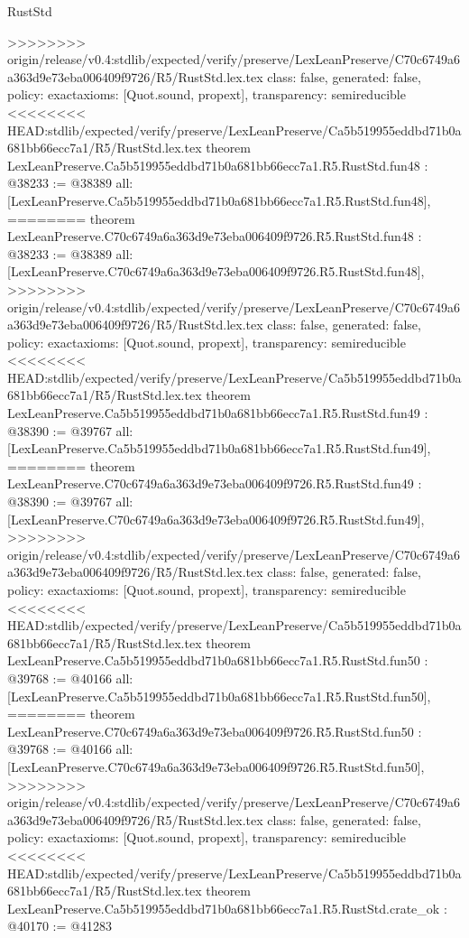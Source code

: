 \begin{lexlean}{RustStd}
\begin{coremodule}
{\begin{coremodule}
{{{{{{{{{{{{{{{{{{{{{{{{{{{{{{{{{{{{{{{{{{{{{{{{{{{>>>>>>>> origin/release/v0.4:stdlib/expected/verify/preserve/LexLeanPreserve/C70c6749a6a363d9e73eba006409f9726/R5/RustStd.lex.tex
  class: false,
  generated: false,
  policy: exact{axioms: [Quot.sound, propext]},
  transparency: semireducible
}
<<<<<<<< HEAD:stdlib/expected/verify/preserve/LexLeanPreserve/Ca5b519955eddbd71b0a681bb66ecc7a1/R5/RustStd.lex.tex
theorem LexLeanPreserve.Ca5b519955eddbd71b0a681bb66ecc7a1.R5.RustStd.fun48 : @38233 := @38389 {
  all: [LexLeanPreserve.Ca5b519955eddbd71b0a681bb66ecc7a1.R5.RustStd.fun48],
========
theorem LexLeanPreserve.C70c6749a6a363d9e73eba006409f9726.R5.RustStd.fun48 : @38233 := @38389 {
  all: [LexLeanPreserve.C70c6749a6a363d9e73eba006409f9726.R5.RustStd.fun48],
>>>>>>>> origin/release/v0.4:stdlib/expected/verify/preserve/LexLeanPreserve/C70c6749a6a363d9e73eba006409f9726/R5/RustStd.lex.tex
  class: false,
  generated: false,
  policy: exact{axioms: [Quot.sound, propext]},
  transparency: semireducible
}
<<<<<<<< HEAD:stdlib/expected/verify/preserve/LexLeanPreserve/Ca5b519955eddbd71b0a681bb66ecc7a1/R5/RustStd.lex.tex
theorem LexLeanPreserve.Ca5b519955eddbd71b0a681bb66ecc7a1.R5.RustStd.fun49 : @38390 := @39767 {
  all: [LexLeanPreserve.Ca5b519955eddbd71b0a681bb66ecc7a1.R5.RustStd.fun49],
========
theorem LexLeanPreserve.C70c6749a6a363d9e73eba006409f9726.R5.RustStd.fun49 : @38390 := @39767 {
  all: [LexLeanPreserve.C70c6749a6a363d9e73eba006409f9726.R5.RustStd.fun49],
>>>>>>>> origin/release/v0.4:stdlib/expected/verify/preserve/LexLeanPreserve/C70c6749a6a363d9e73eba006409f9726/R5/RustStd.lex.tex
  class: false,
  generated: false,
  policy: exact{axioms: [Quot.sound, propext]},
  transparency: semireducible
}
<<<<<<<< HEAD:stdlib/expected/verify/preserve/LexLeanPreserve/Ca5b519955eddbd71b0a681bb66ecc7a1/R5/RustStd.lex.tex
theorem LexLeanPreserve.Ca5b519955eddbd71b0a681bb66ecc7a1.R5.RustStd.fun50 : @39768 := @40166 {
  all: [LexLeanPreserve.Ca5b519955eddbd71b0a681bb66ecc7a1.R5.RustStd.fun50],
========
theorem LexLeanPreserve.C70c6749a6a363d9e73eba006409f9726.R5.RustStd.fun50 : @39768 := @40166 {
  all: [LexLeanPreserve.C70c6749a6a363d9e73eba006409f9726.R5.RustStd.fun50],
>>>>>>>> origin/release/v0.4:stdlib/expected/verify/preserve/LexLeanPreserve/C70c6749a6a363d9e73eba006409f9726/R5/RustStd.lex.tex
  class: false,
  generated: false,
  policy: exact{axioms: [Quot.sound, propext]},
  transparency: semireducible
}
<<<<<<<< HEAD:stdlib/expected/verify/preserve/LexLeanPreserve/Ca5b519955eddbd71b0a681bb66ecc7a1/R5/RustStd.lex.tex
theorem LexLeanPreserve.Ca5b519955eddbd71b0a681bb66ecc7a1.R5.RustStd.crate_ok : @40170 := @41283 {
}}}}}}}}}}}}}}}}}}}}}}}}}}}}}}}}}}}}}}}}}}}}}}}}}}}}}}
\end{coremodule}}
\end{coremodule}
\end{lexlean}
